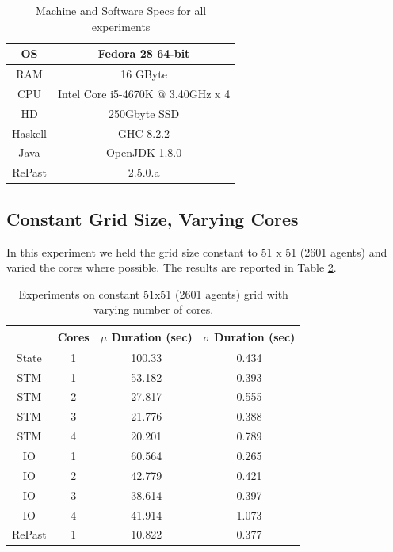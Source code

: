 \begin{table}
	\centering
	\begin{tabular}{ c || c }
		OS & Fedora 28 64-bit \\ \hline
		RAM & 16 GByte \\ \hline
		CPU & Intel Core i5-4670K @ 3.40GHz x 4 \\ \hline
		HD & 250Gbyte SSD \\ \hline
		Haskell & GHC 8.2.2 \\ \hline
		Java & OpenJDK 1.8.0 \\ \hline
		RePast & 2.5.0.a
	\end{tabular}
	
	\caption{Machine and Software Specs for all experiments}
	\label{tab:machine_specs}
\end{table}

\subsection{Constant Grid Size, Varying Cores}
In this experiment we held the grid size constant to 51 x 51 (2601 agents) and varied the cores where possible. The results are reported in Table \ref{tab:constgrid_varyingcores}.

\begin{table}
	\centering
  	\begin{tabular}{ c || c | c | c }
               & Cores & $\mu$ Duration (sec) & $\sigma$ Duration (sec) \\ \hline \hline 
    	State  & 1     & 100.33 & 0.434 \\ \hline \hline
   		STM    & 1     & 53.182 & 0.393 \\ \hline
   		STM    & 2     & 27.817 & 0.555 \\ \hline
   		STM    & 3     & 21.776 & 0.388 \\ \hline
   		STM    & 4     & 20.201 & 0.789 \\ \hline \hline
   		IO     & 1     & 60.564 & 0.265 \\ \hline 
   		IO     & 2     & 42.779 & 0.421 \\ \hline 
   		IO     & 3     & 38.614 & 0.397 \\ \hline 
   		IO     & 4     & 41.914 & 1.073 \\ \hline \hline
   		RePast & 1     & 10.822 & 0.377 \\ \hline 
  	\end{tabular}
  	
  	\caption{Experiments on constant 51x51 (2601 agents) grid with varying number of cores.}
	\label{tab:constgrid_varyingcores}
\end{table}


